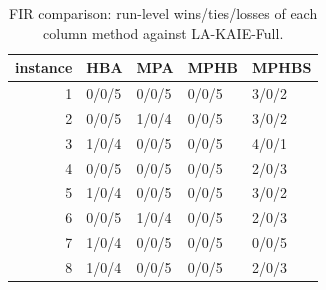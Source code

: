 \begin{table}[t]
\centering
\scriptsize
\caption{FIR comparison: run-level wins/ties/losses of each column method against LA-KAIE-Full.}
\label{tab:fir_comparison_wtl}
\begin{tabular}{rllll}
\toprule
instance & HBA & MPA & MPHB & MPHBS \\
\midrule
1 & 0/0/5 & 0/0/5 & 0/0/5 & 3/0/2 \\
2 & 0/0/5 & 1/0/4 & 0/0/5 & 3/0/2 \\
3 & 1/0/4 & 0/0/5 & 0/0/5 & 4/0/1 \\
4 & 0/0/5 & 0/0/5 & 0/0/5 & 2/0/3 \\
5 & 1/0/4 & 0/0/5 & 0/0/5 & 3/0/2 \\
6 & 0/0/5 & 1/0/4 & 0/0/5 & 2/0/3 \\
7 & 1/0/4 & 0/0/5 & 0/0/5 & 0/0/5 \\
8 & 1/0/4 & 0/0/5 & 0/0/5 & 2/0/3 \\
\bottomrule
\end{tabular}
\end{table}
